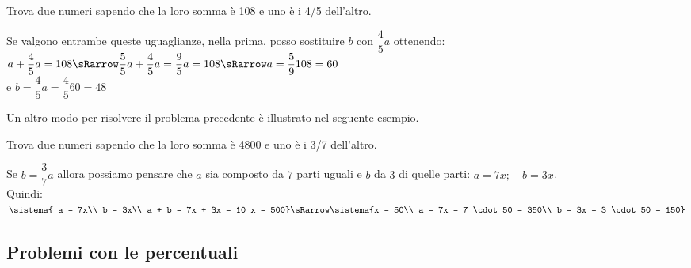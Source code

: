 \begin{esempio}{}{}
Trova due numeri sapendo che la loro somma è 108 e uno è i 4/5 dell'altro.

\vspace{.5em}
\vspace{.5em}
Se valgono entrambe queste uguaglianze, nella prima, posso sostituire \(b\) 
con \(\dfrac{4}{5} a\) ottenendo: \\
\(a + \dfrac{4}{5} a = 108 \sRarrow \dfrac{5}{5} a + \dfrac{4}{5} a = 
  \dfrac{9}{5} a = 108 \sRarrow a = \dfrac{5}{9} 108 = 60\)\\
e \(b = \dfrac{4}{5} a = \dfrac{4}{5} 60 = 48\)
\end{esempio}

Un altro modo per risolvere il problema precedente è illustrato nel 
seguente esempio.

\begin{esempio}{}{}
Trova due numeri sapendo che la loro somma è 4800 e uno è i 3/7 dell'altro.

\vspace{.5em}
\vspace{.5em}
Se \(b = \dfrac{3}{7} a\) allora possiamo pensare che \(a\) sia composto 
da \(7\) parti uguali e \(b\) da \(3\) di quelle parti: 
\(a = 7x; \quad b = 3x\). \\
Quindi:
\(\sistema{
a = 7x\\
b = 3x\\
a + b = 7x + 3x = 10 x = 500} \sRarrow 
\sistema{x = 50\\
a = 7x = 7 \cdot 50 = 350\\
b = 3x = 3 \cdot 50 = 150}\)
\end{esempio}

\subsection{Problemi con le percentuali}

